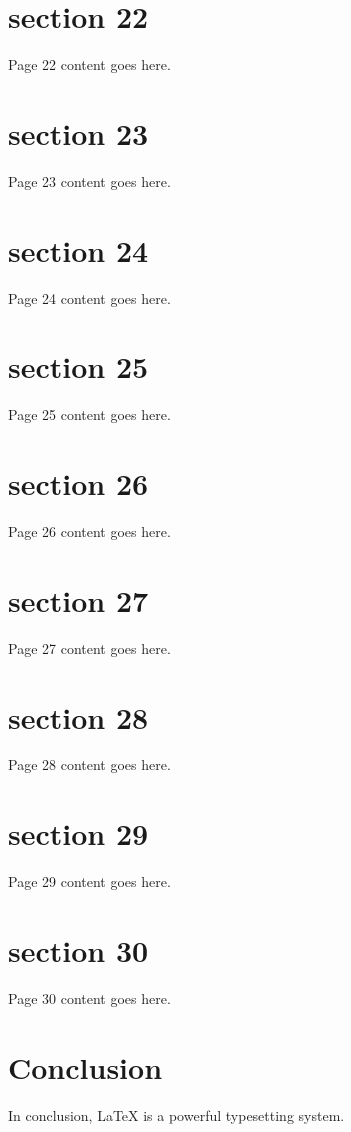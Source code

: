 \documentclass{article}
\begin{document}
\section{section 22}
Page 22 content goes here.
\newpage

\section{section 23}
Page 23 content goes here.
\newpage

\section{section 24}
Page 24 content goes here.
\newpage

\section{section 25}
Page 25 content goes here.
\newpage

\section{section 26}
Page 26 content goes here.
\newpage

\section{section 27}
Page 27 content goes here.
\newpage

\section{section 28}
Page 28 content goes here.
\newpage

\section{section 29}
Page 29 content goes here.
\newpage

\section{section 30}
Page 30 content goes here.
\newpage




\section{Conclusion}
In conclusion, LaTeX is a powerful typesetting system.

\end{document}
